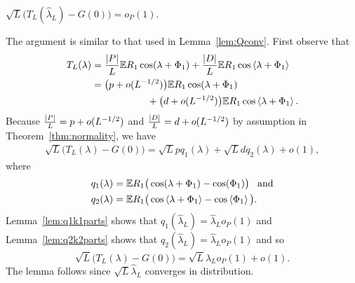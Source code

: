\documentclass[journal]{IEEEtran}
\begin{document}
\begin{lemma}\label{lem:HLtoG} $\sqrt{L}\big( T_L(\hat{\lambda}_L) - G(0) \big) = o_P(1)$.
\end{lemma}
\begin{IEEEproof}
The argument is similar to that used in Lemma~\ref{lem:Qconv}.  First observe that
\begin{align*}
T_L(\lambda) &= \frac{{\vert P \vert}}{L}{\mathbb E} R_1\cos(\lambda + \Phi_1) + \frac{{\vert D \vert}}{L} {\mathbb E} R_1\cos\left\langle \lambda + \Phi_1 \right\rangle \\
&=  \big( p + o(L^{-1/2}) \big) {\mathbb E} R_1\cos(\lambda + \Phi_1) \\
&\hspace{2cm} + \big( d + o(L^{-1/2}) \big) {\mathbb E} R_1\cos\left\langle \lambda + \Phi_1 \right\rangle.
\end{align*}
Because $\tfrac{{\left\vert P \right\vert}}{L} = p + o(L^{-1/2})$ and $\tfrac{{\left\vert D \right\vert}}{L} = d + o(L^{-1/2})$ by assumption in Theorem~\ref{thm:normality}, we have
\begin{align*}
\sqrt{L}\big( T_L(\lambda) - G(0) \big) = \sqrt{L}p q_1(\lambda) + \sqrt{L} d q_2(\lambda) + o(1),
\end{align*}
where
\begin{align}
q_1(\lambda) &= {\mathbb E} R_1\big( \cos(\lambda + \Phi_1) - \cos(\Phi_1) \big) \;\;\; \text{and} \nonumber \\
q_2(\lambda) &= {\mathbb E} R_1\big( \cos\left\langle \lambda + \Phi_1 \right\rangle - \cos\left\langle \Phi_1 \right\rangle \big). \label{eq:q2def}
\end{align}
Lemma~\ref{lem:q1k1parts} shows that $q_1(\hat{\lambda}_L) = \hat{\lambda}_Lo_P(1)$ and Lemma~\ref{lem:q2k2parts} shows that $q_2(\hat{\lambda}_L) = \hat{\lambda}_L o_P(1)$ and so
\[
\sqrt{L}\big( T_L(\lambda) - G(0) \big) =\sqrt{L}\hat{\lambda}_L o_P(1) + o(1).
\]
The lemma follows since $\sqrt{L}\hat{\lambda}_L$ converges in distribution.
\end{IEEEproof}
\end{document}
